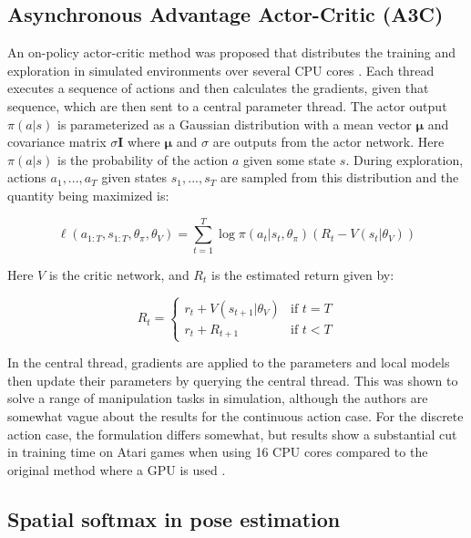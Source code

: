 \subsection{Asynchronous Advantage Actor-Critic (A3C)}

An on-policy actor-critic method was proposed that distributes the training
and exploration in simulated environments over several CPU cores
\cite{mnih2016asynchronous}. Each thread executes a sequence of actions and
then calculates the gradients, given that sequence, which are then sent to a
central parameter thread. The actor output $\pi(a|s)$ is parameterized as a Gaussian distribution
with a mean vector $\mathbf{\mu}$ and covariance matrix $\sigma\mathbf{I}$ where $\mathbf{\mu}$
and $\sigma$ are outputs from the actor network. Here $\pi(a|s)$ is the probability of the action $a$ given
some state $s$.
During exploration, actions $a_1, ..., a_T$ given states $s_1, ..., s_T$ are sampled from this distribution and the quantity being maximized
is:

\begin{equation}
    \ell(a_{1:T}, s_{1:T}, \theta_\pi, \theta_V) = \sum_{t=1}^T \log \pi (a_t|s_t, \theta_\pi) (R_t - V(s_t|\theta_V))
\end{equation}

Here $V$ is the critic network, and $R_t$ is the estimated return given by:

\begin{equation}
    R_t =
    \begin{cases}
        r_t + V(s_{t+1}|\theta_V) & \text{if } t = T\\
        r_t + R_{t+1} & \text{if } t < T
    \end{cases}
\end{equation}

In the central thread, gradients are applied to the parameters and local models
then update their parameters by querying the central thread. This was shown to
solve a range of manipulation tasks in simulation, although the authors are
somewhat vague about the results for the continuous action case. For the
discrete action case, the formulation differs somewhat, but results show a
substantial cut in training time on Atari games when using 16 CPU cores
compared to the original method where a GPU is used \cite{mnih2013playing}.

\subsection{Spatial softmax in pose estimation}

